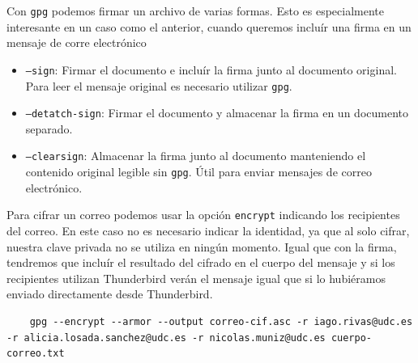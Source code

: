 \begin{tcolorbox}[
    colback=orange!5!white,
    colframe=orange!75!black,
    title=Tipos de firmas en PGP
]
Con \texttt{gpg} podemos firmar un archivo de varias formas. Esto es especialmente interesante en un caso como el anterior, cuando queremos incluír una firma en un mensaje de corre electrónico
\begin{itemize}
    \item \texttt{--sign}: Firmar el documento e incluír la firma junto al documento original. Para leer el mensaje original es necesario utilizar \texttt{gpg}.
    \item \texttt{--detatch-sign}: Firmar el documento y almacenar la firma en un documento separado.
    \item \texttt{--clearsign}: Almacenar la firma junto al documento manteniendo el contenido original legible sin \texttt{gpg}. Útil para enviar mensajes de correo electrónico.
\end{itemize}
\end{tcolorbox}

Para cifrar un correo podemos usar la opción \texttt{encrypt} indicando los recipientes del correo. En este caso no es necesario indicar la identidad, ya que al solo cifrar, nuestra clave privada no se utiliza en ningún momento. Igual que con la firma, tendremos que incluír el resultado del cifrado en el cuerpo del mensaje y si los recipientes utilizan Thunderbird verán el mensaje igual que si lo hubiéramos enviado directamente desde Thunderbird.

\begin{verbatim}
    gpg --encrypt --armor --output correo-cif.asc -r iago.rivas@udc.es -r alicia.losada.sanchez@udc.es -r nicolas.muniz@udc.es cuerpo-correo.txt
\end{verbatim}

